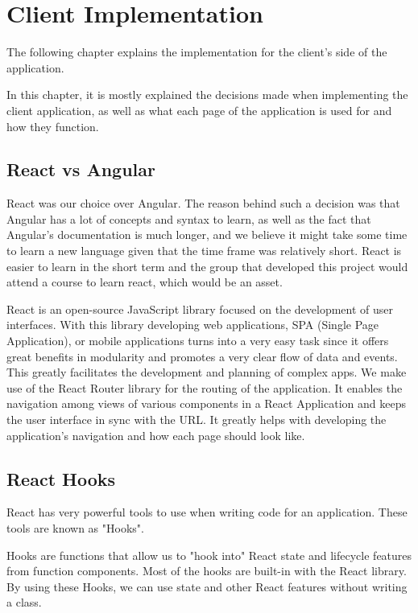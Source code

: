 \documentclass[a4paper,twoside,10pt]{report}
\begin{document}
\chapter{Client Implementation}
The following chapter explains the implementation for the client’s side of the application. 

In this chapter, it is mostly explained the decisions made when implementing the client application, as well as what each page of the application is used for and how they function.
 
\section{React vs Angular}
React was our choice over Angular. The reason behind such a decision was that Angular has a lot of concepts and syntax to learn, as well as the fact that Angular's documentation is much longer, and we believe it might take some time to learn a new language given that the time frame was relatively short. React is easier to learn in the short term and the group that developed this project would attend a course to learn react, which would be an asset.

React is an open-source JavaScript library focused on the development of user interfaces. With this library developing web applications, SPA (Single Page Application), or mobile applications turns into a very easy task since it offers great benefits in modularity and promotes a very clear flow of data and events. This greatly facilitates the development and planning of complex apps.
We make use of the React Router library for the routing of the application. It enables the navigation among views of various components in a React Application and keeps the user interface in sync with the URL. It greatly helps with developing the application's navigation and how each page should look like.

\section{React Hooks}
React has very powerful tools to use when writing code for an application. These tools are known as "Hooks".

Hooks are functions that allow us to "hook into" React state and lifecycle features from function components. Most of the hooks are built-in with the React library. By using these Hooks, we can use state and other React features without writing a class.
\end{document}

